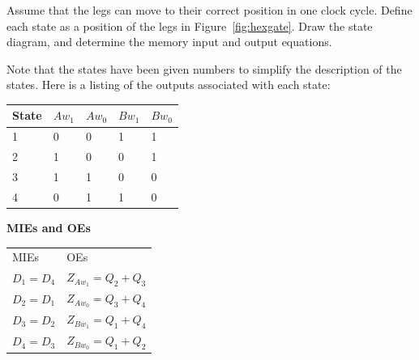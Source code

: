 \begin{enumerate}
Assume that the legs can move to their correct position in one clock
cycle.  Define each state as a position of the legs in 
Figure~\ref{fig:hexgate}. Draw the state diagram,
and determine the memory input and output equations.

\begin{solution}{

\begin{figure}[ht]
\end{figure}

Note that the states have been given numbers to simplify the
description of the states.  Here is a listing of the outputs 
associated with each state:

\begin{tabular}{l|l|l|l|l}
State  & $Aw_1$ & $Aw_0$ & $Bw_1$ & $Bw_0$  \\ \hline
1	& 0	& 0	 & 1	  & 1		\\ \hline
2	& 1	& 0	 & 0	  & 1		\\ \hline
3	& 1	& 1	 & 0	  & 0		\\ \hline
4	& 0	& 1	 & 1	  & 0		\\ 
\end{tabular}

{\bf MIEs and OEs}

\begin{tabular}{ll}
MIEs		&	OEs			\\
$D_1 = D_4$	&	$Z_{Aw_1} = Q_2 + Q_3$	\\
$D_2 = D_1$	&	$Z_{Aw_0} = Q_3 + Q_4$	\\
$D_3 = D_2$	&	$Z_{Bw_1} = Q_1 + Q_4$	\\
$D_4 = D_3$	&	$Z_{Bw_0} = Q_1 + Q_2$	\\
\end{tabular}

}
\end{solution}
\end{enumerate}
